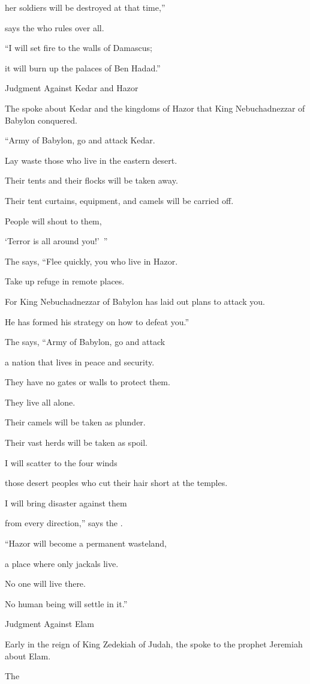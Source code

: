 {her soldiers
will be destroyed
at that time,”
\par }{\Q says
the {}
who rules over all.
\par }{\Q {}“I will set
fire
to the walls
of Damascus;
\par }{\Q it will burn up
the palaces
of Ben Hadad.”
\par }{\SH Judgment Against Kedar and Hazor
\par }{\PP {}The
{}
spoke
about
Kedar
and the kingdoms
of Hazor
that
King
Nebuchadnezzar
of Babylon conquered.
\par }{\Q “Army of Babylon,
go
and attack
Kedar.
\par }{\Q Lay waste
those who live in
the eastern desert.
\par }{\Q {}Their tents
and their flocks
will be taken
away.
\par }{\Q Their tent curtains,
equipment,
and camels
will be carried
off.
\par }{\Q People will shout
to them,
\par }{\Q ‘Terror
is all around you!’ ”
\par }{\Q {}The
{}
says, “Flee
quickly,
you who live
in
Hazor.
\par }{\Q Take up refuge in
remote places.
\par }{\Q For
King
Nebuchadnezzar
of Babylon
has laid out plans
to attack you.
\par }{\Q He has formed his strategy
on
how to defeat you.”
\par }{\Q {}The
{}
says, “Army of Babylon,
go
and attack
\par }{\Q a nation
that lives in
peace and security.
\par }{\Q They have no
gates
or
walls
to protect them.

\par }{\Q They live
all alone.
\par }{\Q {}Their camels
will be
taken as plunder.
\par }{\Q Their vast
herds
will be taken as spoil.
\par }{\Q I will scatter
to the four winds
\par }{\Q those desert peoples who cut their hair short
at the temples.
\par }{\Q I will bring
disaster
against them
\par }{\Q from
every
direction,” says
the {}.
\par }{\Q {}“Hazor
will become
a permanent
wasteland,
\par }{\Q a place where only
jackals
live.
\par }{\Q No
one
will live
there.
\par }{\Q No
human being
will settle in it.”
\par }{\SH Judgment Against Elam
\par }{\PP {}Early
in the reign
of King
Zedekiah
of Judah,
the {}
spoke
to
the prophet
Jeremiah
about
Elam.
\par }{\PP {}The

}
